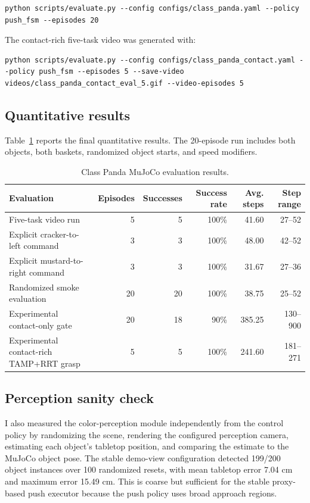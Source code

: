 \documentclass{article}
\begin{document}
\begin{lstlisting}[style=cmd]
python scripts/evaluate.py --config configs/class_panda.yaml --policy push_fsm --episodes 20
\end{lstlisting}

The contact-rich five-task video was generated with:

\begin{lstlisting}[style=cmd]
python scripts/evaluate.py --config configs/class_panda_contact.yaml --policy push_fsm --episodes 5 --save-video videos/class_panda_contact_eval_5.gif --video-episodes 5
\end{lstlisting}

\subsection{Quantitative results}

Table~\ref{tab:results} reports the final quantitative results. The 20-episode run includes both objects, both baskets, randomized object starts, and speed modifiers.

\begin{table}[h]
\centering
\caption{Class Panda MuJoCo evaluation results.}
\label{tab:results}
\begin{tabular}{lrrrrr}
\toprule
Evaluation & Episodes & Successes & Success rate & Avg. steps & Step range \\
\midrule
Five-task video run & 5 & 5 & 100\% & 41.60 & 27--52 \\
Explicit cracker-to-left command & 3 & 3 & 100\% & 48.00 & 42--52 \\
Explicit mustard-to-right command & 3 & 3 & 100\% & 31.67 & 27--36 \\
Randomized smoke evaluation & 20 & 20 & 100\% & 38.75 & 25--52 \\
Experimental contact-only gate & 20 & 18 & 90\% & 385.25 & 130--900 \\
Experimental contact-rich TAMP+RRT grasp & 5 & 5 & 100\% & 241.60 & 181--271 \\
\bottomrule
\end{tabular}
\end{table}

\subsection{Perception sanity check}

I also measured the color-perception module independently from the control policy by randomizing the scene, rendering the configured perception camera, estimating each object's tabletop position, and comparing the estimate to the MuJoCo object pose. The stable demo-view configuration detected 199/200 object instances over 100 randomized resets, with mean tabletop error 7.04 cm and maximum error 15.49 cm. This is coarse but sufficient for the stable proxy-based push executor because the push policy uses broad approach regions.
\end{document}
